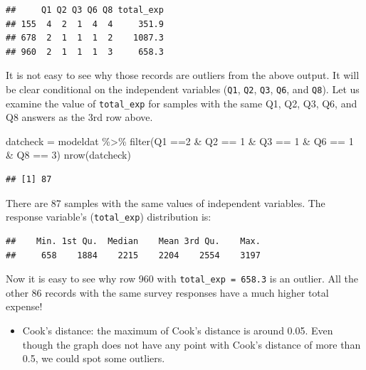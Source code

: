 \documentclass[
  12pt,
]{krantz}
\makeatletter
\newenvironment{Shaded}{\begin{snugshade}}{\end{snugshade}}
\newcommand{\DecValTok}[1]{\textcolor[rgb]{0.06,0.06,0.06}{#1}}
\newcommand{\FunctionTok}[1]{\textcolor[rgb]{0,0,0}{#1}}
\newcommand{\NormalTok}[1]{#1}
\newcommand{\OtherTok}[1]{\textcolor[rgb]{0.37,0.37,0.37}{#1}}
\newcommand{\SpecialCharTok}[1]{\textcolor[rgb]{0,0,0}{#1}}
\providecommand{\tightlist}{%
  \setlength{\itemsep}{0pt}\setlength{\parskip}{0pt}}
\newenvironment{kframe}{%
\medskip{}
\setlength{\fboxsep}{.8em}
 \def\at@end@of@kframe{}%
 \ifinner\ifhmode%
  \def\at@end@of@kframe{\end{minipage}}%
  \begin{minipage}{\columnwidth}%
 \fi\fi%
 \def\FrameCommand##1{\hskip\@totalleftmargin \hskip-\fboxsep
 \colorbox{shadecolor}{##1}\hskip-\fboxsep
     \hskip-\linewidth \hskip-\@totalleftmargin \hskip\columnwidth}%
 \MakeFramed {\advance\hsize-\width
   \@totalleftmargin\z@ \linewidth\hsize
   \@setminipage}}%
 {\par\unskip\endMakeFramed%
 \at@end@of@kframe}
\renewenvironment{Shaded}{\begin{kframe}}{\end{kframe}}
\makeatother
\begin{document}
\begin{verbatim}
##     Q1 Q2 Q3 Q6 Q8 total_exp
## 155  4  2  1  4  4     351.9
## 678  2  1  1  1  2    1087.3
## 960  2  1  1  1  3     658.3
\end{verbatim}

It is not easy to see why those records are outliers from the above output. It will be clear conditional on the independent variables (\texttt{Q1}, \texttt{Q2}, \texttt{Q3}, \texttt{Q6}, and \texttt{Q8}). Let us examine the value of \texttt{total\_exp} for samples with the same Q1, Q2, Q3, Q6, and Q8 answers as the 3rd row above.

\begin{Shaded}
\begin{Highlighting}[]
\NormalTok{datcheck }\OtherTok{=}\NormalTok{ modeldat }\SpecialCharTok{\%\textgreater{}\%} 
  \FunctionTok{filter}\NormalTok{(Q1 }\SpecialCharTok{==}\DecValTok{2} \SpecialCharTok{\&}\NormalTok{ Q2 }\SpecialCharTok{==} \DecValTok{1} \SpecialCharTok{\&}\NormalTok{ Q3 }\SpecialCharTok{==} \DecValTok{1} \SpecialCharTok{\&}\NormalTok{ Q6 }\SpecialCharTok{==} \DecValTok{1} \SpecialCharTok{\&}\NormalTok{ Q8 }\SpecialCharTok{==} \DecValTok{3}\NormalTok{) }
\FunctionTok{nrow}\NormalTok{(datcheck)}
\end{Highlighting}
\end{Shaded}

\begin{verbatim}
## [1] 87
\end{verbatim}

There are 87 samples with the same values of independent variables. The response variable's (\texttt{total\_exp}) distribution is:

\begin{Shaded}
\end{Shaded}

\begin{verbatim}
##    Min. 1st Qu.  Median    Mean 3rd Qu.    Max. 
##     658    1884    2215    2204    2554    3197
\end{verbatim}

Now it is easy to see why row 960 with \texttt{total\_exp\ =\ 658.3} is an outlier. All the other 86 records with the same survey responses have a much higher total expense!

\begin{itemize}
\tightlist
\item
  Cook's distance: the maximum of Cook's distance is around 0.05. Even though the graph does not have any point with Cook's distance of more than 0.5, we could spot some outliers.
\end{itemize}
\end{document}
